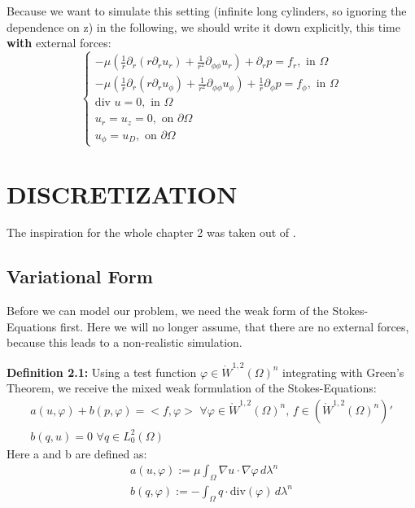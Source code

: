\documentclass[12pt,a4paper]{report}
\begin{document}
Because we want to simulate this setting (infinite long cylinders, so ignoring the dependence on z) in the following, we should write it down explicitly, this time \textbf{with} external forces:\\
\begin{equation}
\begin{cases}
-\mu (\frac{1}{r}\partial_r(r\partial_r u_r) + \frac{1}{r^2}\partial_{\phi \phi} u_r) + \partial_r p = f_r, \text{ in }\Omega\\
-\mu (\frac{1}{r}\partial_r(r\partial_r u_{\phi}) + \frac{1}{r^2}\partial_{\phi \phi} u_{\phi}) + \frac{1}{r}\partial_{\phi} p = f_{\phi}, \text{ in }\Omega\\
\text{div }u = 0,\text{ in }\Omega\\
u_r = u_z = 0, \text{ on }\partial \Omega\\
u_{\phi} = u_D, \text{ on }\partial \Omega
\end{cases}
\end{equation}
\chapter{DISCRETIZATION}
The inspiration for the whole chapter 2 was taken out of \cite{numFlowSaddle}.
\section{Variational Form}
Before we can model our problem, we need the weak form of the Stokes-Equations first. Here we will no longer assume, that there are no external forces, because this leads to a non-realistic simulation.\\

\colorbox{defblue}{\begin{minipage}{15cm}{\textcolor{black}{}{\label{def2.1}}}
\textbf{Definition 2.1:} Using a test function \(\varphi \in \mathring{W}^{1,2}(\Omega)^n\) integrating with Green's Theorem, we receive the mixed weak formulation of the Stokes-Equations:
\begin{equation}
    \begin{array}{l}
    a(u,\varphi) + b(p,\varphi) = <f,\varphi>\,\, \forall \varphi \in \mathring{W}^{1,2}(\Omega)^n, \, f \in (\mathring{W}^{1,2}(\Omega)^n)'\\
    b(q,u) = 0\,\, \forall q \in L^2_0(\Omega)
    \end{array}
\end{equation}
Here a and b are defined as:
\begin{equation}
    \begin{array}{l}
    a(u,\varphi) := \mu \int_{\Omega} \nabla u \cdot \nabla \varphi \, d\lambda^n\\
    b(q,\varphi) := -\int_{\Omega} q \cdot \text{div}(\varphi)\, d\lambda^n
    \end{array}
\end{equation}
\end{minipage}}\\
\end{document}
